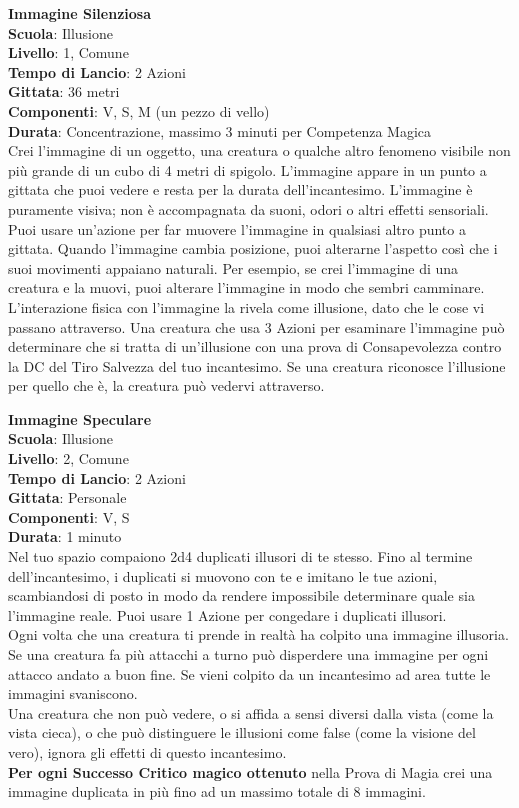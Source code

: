 \begin{multicols}{2}
\medskip\textbf{Immagine Silenziosa}\\
\textbf{Scuola}: Illusione\\
\textbf{Livello}: 1, Comune\\
\textbf{Tempo di Lancio}: 2 Azioni\\
\textbf{Gittata}: 36 metri\\
\textbf{Componenti}: V, S, M (un pezzo di vello)\\
\textbf{Durata}: Concentrazione, massimo 3 minuti per Competenza Magica\\
Crei l'immagine di un oggetto, una creatura o qualche altro fenomeno visibile non più grande di un cubo di 4 metri di spigolo. L'immagine appare in un punto a gittata che puoi vedere e resta per la durata dell'incantesimo. L'immagine è puramente visiva; non è accompagnata da suoni, odori o altri effetti sensoriali. Puoi usare un'azione per far muovere l'immagine in qualsiasi altro punto a gittata. Quando l'immagine cambia posizione, puoi alterarne l'aspetto così che i suoi movimenti appaiano naturali. Per esempio, se crei l'immagine di una creatura e la muovi, puoi alterare l'immagine in modo che sembri camminare.\\
L'interazione fisica con l'immagine la rivela come illusione, dato che le cose vi passano attraverso. Una creatura che usa 3 Azioni per esaminare l'immagine può determinare che si tratta di un'illusione con una prova di Consapevolezza contro la DC del Tiro Salvezza del tuo incantesimo. Se una creatura riconosce l'illusione per quello che è, la creatura può vedervi attraverso.

\medskip\textbf{Immagine Speculare}\\
\textbf{Scuola}: Illusione\\
\textbf{Livello}: 2, Comune\\
\textbf{Tempo di Lancio}: 2 Azioni\\
\textbf{Gittata}: Personale\\
\textbf{Componenti}: V, S\\
\textbf{Durata}: 1 minuto\\
Nel tuo spazio compaiono 2d4 duplicati illusori di te stesso. Fino al termine dell'incantesimo, i duplicati si muovono con te e imitano le tue azioni, scambiandosi di posto in modo da rendere impossibile determinare quale sia l'immagine reale. Puoi usare 1 Azione per congedare i duplicati illusori.\\
Ogni volta che una creatura ti prende in realtà ha colpito una immagine illusoria.
Se una creatura fa più attacchi a turno può disperdere una immagine per ogni attacco andato a buon fine. Se vieni colpito da un incantesimo ad area tutte le immagini svaniscono.\\
Una creatura che non può vedere, o si affida a sensi diversi dalla vista (come la vista cieca), o che può distinguere le illusioni come false (come la visione del vero), ignora gli effetti di questo incantesimo.\\
\textbf{Per ogni Successo Critico magico ottenuto} nella Prova di Magia crei una immagine duplicata in più fino ad un massimo totale di 8 immagini.


\end{multicols}
